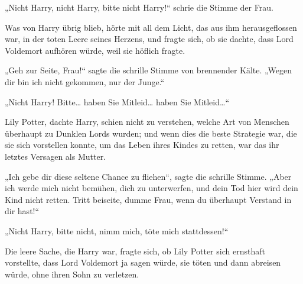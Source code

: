 \begin{em}
„Nicht Harry, nicht Harry, bitte nicht Harry!“ schrie die Stimme der Frau.

Was von Harry übrig blieb, hörte mit all dem Licht, das aus ihm herausgeflossen war, in der toten Leere seines Herzens, und fragte sich, ob sie dachte, dass Lord Voldemort aufhören würde, weil sie höflich fragte.

„Geh zur Seite, Frau!“ sagte die schrille Stimme von brennender Kälte. „Wegen dir bin ich nicht gekommen, nur der Junge.“

„Nicht Harry! Bitte… haben Sie Mitleid… haben Sie Mitleid…“

Lily Potter, dachte Harry, schien nicht zu verstehen, welche Art von Menschen überhaupt zu Dunklen Lords wurden; und wenn dies die beste Strategie war, die sie sich vorstellen konnte, um das Leben ihres Kindes zu retten, war das ihr letztes Versagen als Mutter.

„Ich gebe dir diese seltene Chance zu fliehen“, sagte die schrille Stimme. „Aber ich werde mich nicht bemühen, dich zu unterwerfen, und dein Tod hier wird dein Kind nicht retten. Tritt beiseite, dumme Frau, wenn du überhaupt Verstand in dir hast!“

„Nicht Harry, bitte nicht, nimm mich, töte mich stattdessen!“

Die leere Sache, die Harry war, fragte sich, ob Lily Potter sich ernsthaft vorstellte, dass Lord Voldemort ja sagen würde, sie töten und dann abreisen würde, ohne ihren Sohn zu verletzen.


\end{em}

